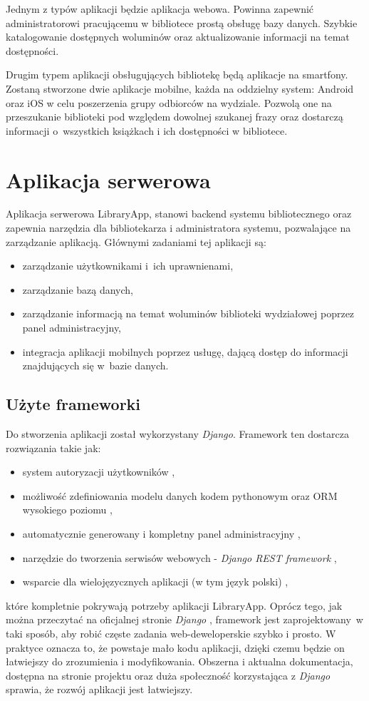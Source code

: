 \documentclass[twoside]{projektInzynierskiMS}
\begin{document}
Jednym z typów aplikacji będzie aplikacja webowa. Powinna zapewnić administratorowi pracującemu w bibliotece prostą obsługę bazy danych. Szybkie katalogowanie dostępnych woluminów oraz aktualizowanie informacji na temat dostępności.

Drugim typem aplikacji obsługujących bibliotekę będą aplikacje na smartfony. Zostaną stworzone dwie aplikacje mobilne, każda na oddzielny system: Android oraz iOS w celu poszerzenia grupy odbiorców na wydziale. Pozwolą one na przeszukanie biblioteki pod względem dowolnej szukanej frazy oraz dostarczą informacji o~wszystkich książkach i ich dostępności w bibliotece.

\section{Aplikacja serwerowa}
Aplikacja serwerowa LibraryApp, stanowi backend systemu bibliotecznego oraz zapewnia narzędzia dla bibliotekarza i administratora systemu, pozwalające na zarządzanie aplikacją. Głównymi zadaniami tej aplikacji są:
\begin{itemize}
	\item zarządzanie użytkownikami i~ich uprawnienami,
	\item zarządzanie bazą danych,
	\item zarządzanie informacją na temat woluminów biblioteki wydziałowej poprzez panel administracyjny,
	\item integracja aplikacji mobilnych poprzez usługę, dającą dostęp do informacji znajdujących się w~bazie danych.
\end{itemize}

\subsection{Użyte frameworki}

Do stworzenia aplikacji został wykorzystany \textit{Django}. Framework ten dostarcza rozwiązania takie jak:
\begin{itemize}
	\item system autoryzacji użytkowników \cite{DjangoAuth},
	\item możliwość zdefiniowania modelu danych kodem pythonowym oraz ORM wysokiego poziomu \cite{DjangoORM},
	\item automatycznie generowany i kompletny panel administracyjny \cite{DjangoAdmin},
	\item narzędzie do tworzenia serwisów webowych - \textit{Django REST framework} \cite{DjangoRest},
	\item wsparcie dla wielojęzycznych aplikacji (w tym język polski) \cite{DjangoTranslation},
\end{itemize}
które kompletnie pokrywają potrzeby aplikacji LibraryApp. Oprócz tego, jak można przeczytać na oficjalnej stronie \textit{Django} \cite{DjangoOfficial}, framework jest zaprojektowany~w taki sposób, aby robić częste zadania web-deweloperskie szybko i prosto. W praktyce oznacza to, że powstaje mało kodu aplikacji, dzięki czemu będzie on łatwiejszy do zrozumienia i modyfikowania. Obszerna i aktualna dokumentacja, dostępna na stronie projektu oraz duża społeczność korzystająca z \textit{Django} sprawia, że rozwój aplikacji jest łatwiejszy.
\end{document}
